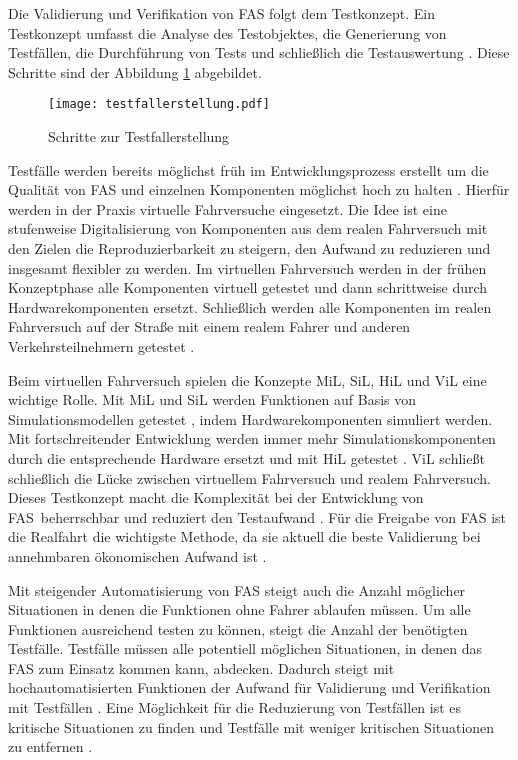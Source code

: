 Die Validierung und Verifikation von \ac{FAS} folgt dem Testkonzept. Ein Testkonzept umfasst die Analyse des Testobjektes, die Generierung von Testfällen, die Durchführung von Tests und schließlich die Testauswertung \cite{schuldt2013effiziente}. Diese Schritte sind der Abbildung \ref{fig_testfallerstellung} abgebildet.

\begin{figure}[h]
\centering
\texttt{[image: testfallerstellung.pdf]}
\caption{Schritte zur Testfallerstellung \cite{schuldt2013effiziente}}
\label{fig_testfallerstellung}
\end{figure}

Testfälle werden bereits möglichst früh im Entwicklungsprozess erstellt um die Qualität von \ac{FAS} und einzelnen Komponenten möglichst hoch zu halten \cite{wachenfeld2015freigabe}. Hierfür werden in der Praxis virtuelle Fahrversuche eingesetzt. Die Idee ist eine stufenweise Digitalisierung von Komponenten aus dem realen Fahrversuch mit den Zielen die Reproduzierbarkeit zu steigern, den Aufwand zu reduzieren und insgesamt flexibler zu werden. Im virtuellen Fahrversuch werden in der frühen Konzeptphase alle Komponenten virtuell getestet und dann schrittweise durch Hardwarekomponenten ersetzt. Schließlich werden alle Komponenten im realen Fahrversuch auf der Straße mit einem realem Fahrer und anderen Verkehrsteilnehmern getestet \cite{hakuli2015virtuelle}.

Beim virtuellen Fahrversuch spielen die Konzepte \ac{MiL}, \ac{SiL}, \ac{HiL} und \ac{ViL} eine wichtige Rolle. Mit \ac{MiL} und \ac{SiL} werden Funktionen auf Basis von Simulationsmodellen getestet \cite{berg2015vehicle}, indem Hardwarekomponenten simuliert werden. Mit fortschreitender Entwicklung werden immer mehr Simulationskomponenten durch die entsprechende Hardware ersetzt und mit \ac{HiL} getestet \cite{hakuli2015virtuelle}. \ac{ViL} schließt schließlich die Lücke zwischen virtuellem Fahrversuch und realem Fahrversuch. Dieses Testkonzept macht die Komplexität bei der Entwicklung von \ac{FAS} beherrschbar und reduziert den Testaufwand \cite{schwab2014durchgangige}. Für die Freigabe von \ac{FAS} ist die Realfahrt die wichtigste Methode, da sie aktuell die beste Validierung bei annehmbaren ökonomischen Aufwand ist \cite{wachenfeld2015freigabe}.

Mit steigender Automatisierung von \ac{FAS} steigt auch die Anzahl möglicher Situationen in denen die Funktionen ohne Fahrer ablaufen müssen. Um alle Funktionen ausreichend testen zu können, steigt die Anzahl der benötigten Testfälle. Testfälle müssen alle potentiell möglichen Situationen, in denen das \ac{FAS} zum Einsatz kommen kann, abdecken. Dadurch steigt mit hochautomatisierten Funktionen der Aufwand für Validierung und Verifikation mit Testfällen \cite{bach2017reactive}. Eine Möglichkeit für die Reduzierung von Testfällen ist es kritische Situationen zu finden und Testfälle mit weniger kritischen Situationen zu entfernen \cite{wachenfeld2015freigabe}.

